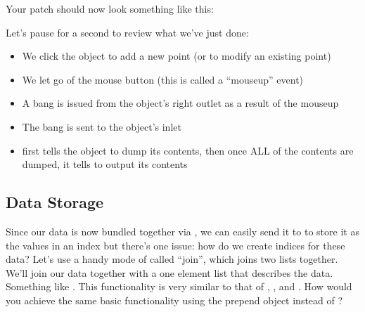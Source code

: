 Your patch should now look something like this:

Let's pause for a second to review what we've just done:
\begin{itemize}
\item We click the  object to add a new point (or to modify an existing point)
\item We let go of the mouse button (this is called a ``mouseup'' event)
\item A bang is issued from the  object's right outlet as a result of the mouseup
\item The bang is sent to the  object's inlet
\item {} first tells the  object to dump its contents, then once ALL of the contents are dumped, it tells  to output its contents
\end{itemize}

\subsection{Data Storage}
Since our data is now bundled together via , we can easily send it to  to store it as the values in an index
but there's one issue:  how do we create indices for these data?  Let's use a handy mode of  called ``join'', which joins two lists together.
We'll join our data together with a one element list that describes the data. Something like .  This functionality is very similar to that of , , and .  How would you achieve the same basic functionality using the prepend object instead of ? 

